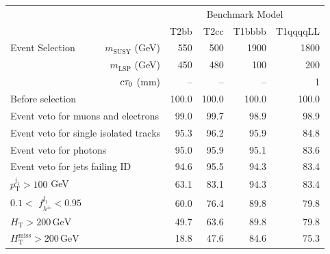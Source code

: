 \begin{table}[p]
    \begin{center}
        \begin{tabular}{lrrrrr}
      \hline
                                 \multirow{5}{*}{Event Selection} &                          &\multicolumn{4}{c}{Benchmark Model} \\\cline{3-6}
                                                                  &                          &  T2bb &  T2cc & T1bbbb & T1qqqqLL  \\
                                                                  & $m_{\textrm{SUSY}}$ (GeV)&   550 &   500 &   1900 &     1800  \\
                                                                  & $m_{\textrm{LSP}}$ (GeV) &   450 &   480 &   100  &     200   \\
                                                                  & $c\tau_{0}$ (mm)             &    -- &    -- &    --  &     1     \\
      \hline
\multicolumn{2}{l}{Before selection}                                                         & 100.0 & 100.0 &  100.0 &     100.0 \\
\multicolumn{2}{l}{Event veto for muons and electrons}                                       &  99.0 &  99.7 &   98.9 &      98.9 \\
\multicolumn{2}{l}{Event veto for single isolated tracks}                                    &  95.3 &  96.2 &   95.9 &      84.8 \\
\multicolumn{2}{l}{Event veto for photons}                                                   &  95.0 &  95.9 &   95.1 &      83.6 \\
\multicolumn{2}{l}{Event veto for jets failing ID}                                           &  94.6 &  95.5 &   94.3 &      83.4 \\
\multicolumn{2}{l}{$p_{\mathrm{T}}^\mathrm{j_1} > 100$ GeV}                                  &  63.1 &  83.1 &   94.3 &      83.4 \\
\multicolumn{2}{l}{$0.1 <$ $f^{\mathrm{j_1}}_{h^\pm} < 0.95$}                                &  60.0 &  76.4 &   89.8 &      79.8 \\
\multicolumn{2}{l}{$H_{\mathrm{T}} > 200\,\mathrm{GeV}$}                                     &  49.7 &  63.6 &   89.8 &      79.8 \\
\multicolumn{2}{l}{$H_{\mathrm{T}}^{\mathrm{miss}} > 200\,\mathrm{GeV}$}                     &  18.8 &  47.6 &   84.6 &      75.3 \\

\end{tabular}
\end{center}
\end{table}
